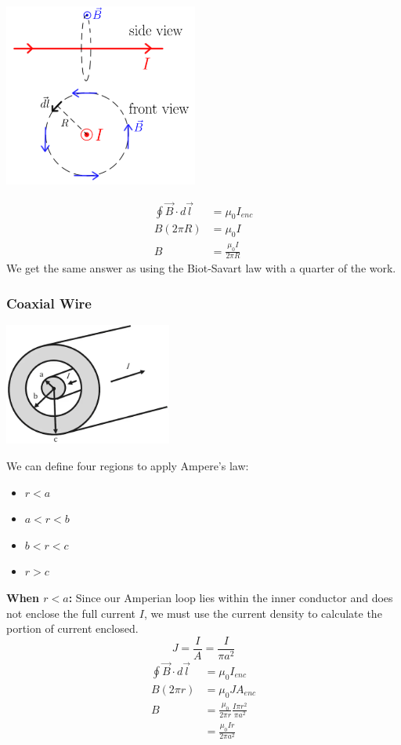 \documentclass[12pt, titlepage]{article}
\begin{document}
\begin{center}
    \includegraphics*[height=6cm]{media/amperelongwire.png}
\end{center}
\begin{align*}
    \oint \vec{B} \cdot d\vec{l} &= \mu_0I_{enc} \\
    B(2\pi R) &= \mu_0 I \\
    B &= \boxed{\frac{\mu_0 I}{2\pi R}}
\end{align*}
We get the same answer as using the Biot-Savart law with a quarter of the work.

\subsubsection*{Coaxial Wire}

\begin{center}
    \includegraphics*[height=4cm]{media/coaxial.png}
\end{center}
We can define four regions to apply Ampere's law:
\begin{multicols}{2}
    \begin{itemize}
        \item $r<a$ 
        \item $a<r<b$ 
        \item $b<r<c$ 
        \item $r>c$ 
    \end{itemize}
\end{multicols}
\textbf{When $r<a$:}
Since our Amperian loop lies within the inner conductor and does not enclose the full current $I$, we must use the current density to calculate the portion of current enclosed.
\begin{equation*}
    J=\frac{I}{A}=\frac{I}{\pi a^2}
\end{equation*}
\begin{align*}
    \oint \vec{B} \cdot d\vec{l} &= \mu_0I_{enc} \\
    B(2\pi r) &= \mu_0 JA_{enc} \\
    B &= \frac{\mu_0}{2 \pi r} \frac{I\pi r^2}{\pi a^2} \\
    &= \boxed{\frac{\mu_0Ir}{2 \pi a^2}}
\end{align*}
\end{document}
